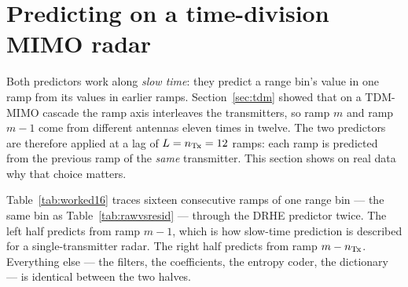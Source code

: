 \section{Predicting on a time-division MIMO radar}
\label{sec:predaxis}

Both predictors work along \emph{slow time}: they predict a range bin's value
in one ramp from its values in earlier ramps. Section~\ref{sec:tdm} showed that
on a TDM-MIMO cascade the ramp axis interleaves the transmitters, so ramp $m$
and ramp $m-1$ come from different antennas eleven times in twelve. The two
predictors are therefore applied at a lag of $L = n_{\mathrm{Tx}} = 12$ ramps: each ramp
is predicted from the previous ramp of the \emph{same} transmitter. This
section shows on real data why that choice matters.

Table~\ref{tab:worked16} traces sixteen consecutive ramps of one range bin ---
the same bin as Table~\ref{tab:rawvsresid} --- through the DRHE predictor twice.
The left half predicts from ramp $m-1$, which is how slow-time prediction is
described for a single-transmitter radar. The right half predicts from ramp
$m - n_{\mathrm{Tx}}$. Everything else --- the filters, the coefficients, the entropy
coder, the dictionary --- is identical between the two halves.

